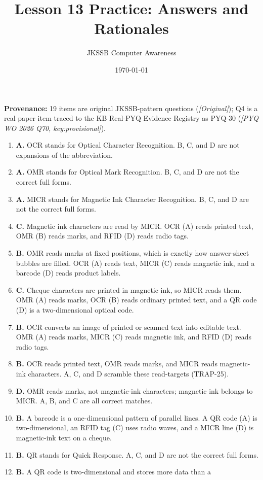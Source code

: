 \documentclass[11pt]{article}
\title{Lesson 13 Practice: Answers and Rationales}
\author{JKSSB Computer Awareness}
\date{\today}
\begin{document}
\maketitle
\noindent\textbf{Provenance:} 19 items are original JKSSB-pattern questions
(\textit{[Original]}); Q4 is a real paper item traced to the KB Real-PYQ
Evidence Registry as PYQ-30 (\textit{[PYQ WO 2026 Q70, key:provisional]}).
\begin{enumerate}[label=\textbf{Q\arabic*.}, leftmargin=*]
\item \textbf{A.} OCR stands for Optical Character Recognition. B, C, and D
  are not expansions of the abbreviation.
\item \textbf{A.} OMR stands for Optical Mark Recognition. B, C, and D are
  not the correct full forms.
\item \textbf{A.} MICR stands for Magnetic Ink Character Recognition. B, C,
  and D are not the correct full forms.
\item \textbf{C.} Magnetic ink characters are read by MICR. OCR (A) reads
  printed text, OMR (B) reads marks, and RFID (D) reads radio tags.
\item \textbf{B.} OMR reads marks at fixed positions, which is exactly how
  answer-sheet bubbles are filled. OCR (A) reads text, MICR (C) reads
  magnetic ink, and a barcode (D) reads product labels.
\item \textbf{C.} Cheque characters are printed in magnetic ink, so MICR
  reads them. OMR (A) reads marks, OCR (B) reads ordinary printed text, and
  a QR code (D) is a two-dimensional optical code.
\item \textbf{B.} OCR converts an image of printed or scanned text into
  editable text. OMR (A) reads marks, MICR (C) reads magnetic ink, and RFID
  (D) reads radio tags.
\item \textbf{B.} OCR reads printed text, OMR reads marks, and MICR reads
  magnetic-ink characters. A, C, and D scramble these read-targets
  (TRAP-25).
\item \textbf{D.} OMR reads marks, not magnetic-ink characters; magnetic ink
  belongs to MICR. A, B, and C are all correct matches.
\item \textbf{B.} A barcode is a one-dimensional pattern of parallel lines.
  A QR code (A) is two-dimensional, an RFID tag (C) uses radio waves, and a
  MICR line (D) is magnetic-ink text on a cheque.
\item \textbf{B.} QR stands for Quick Response. A, C, and D are not the
  correct full forms.
\item \textbf{B.} A QR code is two-dimensional and stores more data than a

\end{enumerate}
\end{document}
